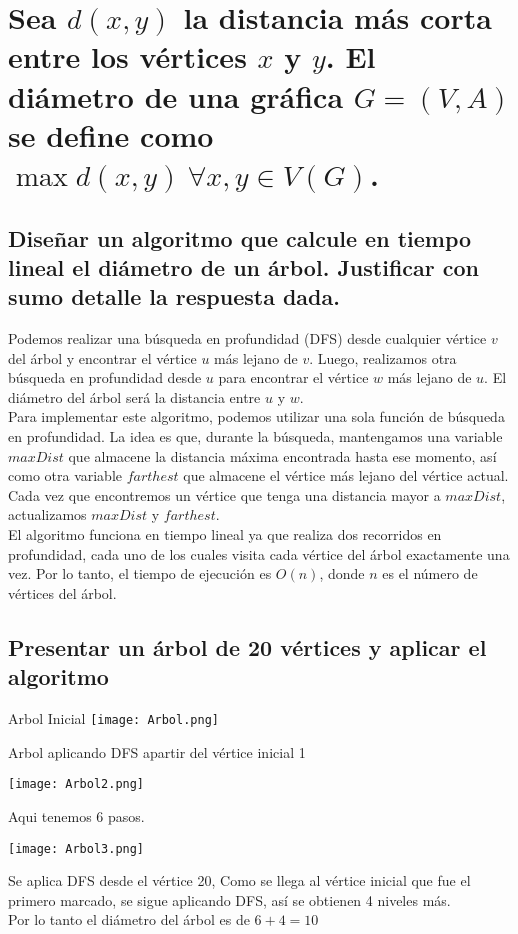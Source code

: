 \section{Sea $d(x, y)$ la distancia más corta entre los vértices $x$ y $y$. El diámetro de una
gráfica $G = (V, A)$ se define como $\max{d(x, y) \: \forall x, y \in V (G)}$.}

\subsection{ Diseñar un algoritmo que calcule en tiempo lineal el diámetro de un árbol.
Justificar con sumo detalle la respuesta dada.}


Podemos realizar una búsqueda en profundidad (DFS) desde cualquier vértice $v$ del árbol y
encontrar el vértice $u$ más lejano de $v$. Luego, realizamos otra búsqueda en profundidad desde $u$ 
para encontrar el vértice $w$ más lejano de $u$. El diámetro del árbol será la distancia entre $u$ y
$w$.\\

Para implementar este algoritmo, podemos utilizar una sola función de búsqueda en profundidad. 
La idea es que, durante la búsqueda, mantengamos una variable $maxDist$ que almacene la distancia 
máxima encontrada hasta ese momento, así como otra variable $farthest$ que almacene el vértice más 
lejano del vértice actual. Cada vez que encontremos un vértice que tenga una distancia mayor a 
$maxDist$, actualizamos $maxDist$ y $farthest$.\\

El algoritmo funciona en tiempo lineal ya que realiza dos recorridos en profundidad, 
cada uno de los cuales visita cada vértice del árbol exactamente una vez. 
Por lo tanto, el tiempo de ejecución es $O(n)$, donde $n$ es el número de vértices del árbol.

\subsection{Presentar un árbol de 20 vértices y aplicar el algoritmo}

Arbol Inicial
\texttt{[image: Arbol.png]}

Arbol aplicando DFS apartir del vértice inicial \textsc{1}

\texttt{[image: Arbol2.png]}

Aqui tenemos 6 pasos.

\texttt{[image: Arbol3.png]}

Se aplica DFS desde el vértice 20, 
Como se llega al vértice inicial que fue el primero marcado, se sigue aplicando DFS, así se obtienen 4 niveles más.\\

Por lo tanto el diámetro del árbol es de $6+4=10$
